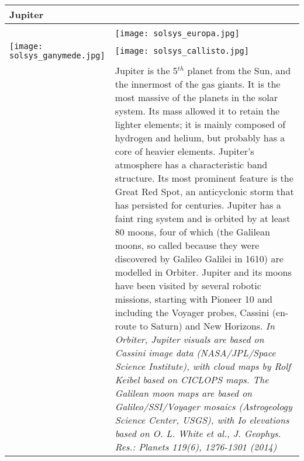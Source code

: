 \documentclass[Orbiter User Manual.tex]{subfiles}
\begin{document}
\begin{table}[H]
	\begin{tabularx}{\textwidth}{ |lX| }
	\hline\rule{0pt}{2ex}
	\textbf{Jupiter} &\\
	\hline\rule{0pt}{2ex}
	\adjustbox{valign=t}{
		\begin{tabular}{ c }
		\texttt{[image: solsys\_jupiter.jpg]}\\
			\adjustbox{valign=t}{
			\begin{tabular}{ ll }
			\texttt{[image: solsys\_io.jpg]} &
			\texttt{[image: solsys\_europa.jpg]}\\
			\texttt{[image: solsys\_ganymede.jpg]} &
			\texttt{[image: solsys\_callisto.jpg]}\\
			\end{tabular}
			}
		\end{tabular}
		}
	& \vfill
	Jupiter is the 5$^{th}$ planet from the Sun, and the innermost of the gas giants. It is the most massive of the planets in the solar system. Its mass allowed it to retain the lighter elements; it is mainly composed of hydrogen and helium, but probably has a core of heavier elements. Jupiter’s atmosphere has a characteristic band structure. Its most prominent feature is the Great Red Spot, an anticyclonic storm that has persisted for centuries.\newline
	Jupiter has a faint ring system and is orbited by at least 80 moons, four of which (the Galilean moons, so called because they were discovered by Galileo Galilei in 1610) are modelled in Orbiter.\newline
	Jupiter and its moons have been visited by several robotic missions, starting with Pioneer 10 and including the Voyager probes, Cassini (en-route to Saturn) and New Horizons.\newline
	\newline
	\textit{In Orbiter, Jupiter visuals are based on Cassini image data (NASA/JPL/Space Science Institute), with cloud maps by Rolf Keibel based on CICLOPS maps.\newline
	The Galilean moon maps are based on Galileo/SSI/Voyager mosaics (Astrogeology Science Center, USGS), with Io elevations based on O. L. White et al., J. Geophys. Res.: Planets 119(6), 1276-1301 (2014)}\\
	\hline
	\end{tabularx}
\end{table}
\end{document}
